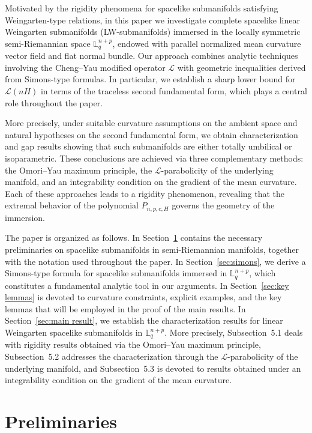\documentclass[leqno,11pt]{amsart}
\theoremstyle{plain}
\theoremstyle{definition}
\numberwithin{equation}{section}
\begin{document}
Motivated by the rigidity phenomena for spacelike submanifolds satisfying Weingarten-type relations, in this paper we investigate complete spacelike linear Weingarten submanifolds (LW-submanifolds) immersed in the locally symmetric semi-Riemannian space $\mathbb{L}_{q}^{n+p}$, endowed with parallel normalized mean curvature vector field and flat normal bundle. Our approach combines analytic techniques involving the Cheng--Yau modified operator $\mathcal{L}$ with geometric inequalities derived from Simons-type formulas. In particular, we establish a sharp lower bound for $\mathcal{L}(nH)$ in terms of the traceless second fundamental form, which plays a central role throughout the paper.

More precisely, under suitable curvature assumptions on the ambient space and natural hypotheses on the second fundamental form, we obtain characterization and gap results showing that such submanifolds are either totally umbilical or isoparametric. These conclusions are achieved via three complementary methods: the Omori--Yau maximum principle, the $\mathcal{L}$-parabolicity of the underlying manifold, and an integrability condition on the gradient of the mean curvature. Each of these approaches leads to a rigidity phenomenon, revealing that the extremal behavior of the polynomial $P_{n,p,c,H}$ governs the geometry of the immersion.

The paper is organized as follows. In Section~\ref{sec:preliminaries} contains the necessary preliminaries on spacelike submanifolds in semi-Riemannian manifolds, together with the notation used throughout the paper. In Section~\ref{sec:simons}, we derive a Simons-type formula for spacelike submanifolds immersed in $\mathbb{L}_{q}^{n+p}$, which constitutes a fundamental analytic tool in our arguments. In Section~\ref{sec:key lemmas} is devoted to curvature constraints, explicit examples, and the key lemmas that will be employed in the proof of the main results. In Section~\ref{sec:main result}, we establish the characterization results for linear Weingarten spacelike submanifolds in $\mathbb{L}_{q}^{n+p}$. More precisely, Subsection~5.1 deals with rigidity results obtained via the Omori--Yau maximum principle, Subsection~5.2 addresses the characterization through the $\mathcal{L}$-parabolicity of the underlying manifold, and Subsection~5.3 is devoted to results obtained under an integrability condition on the gradient of the mean curvature.



\section{Preliminaries}\label{sec:preliminaries}
\end{document}
